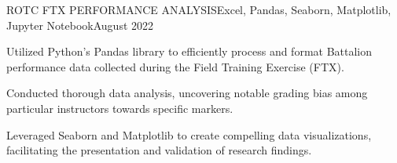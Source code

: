 \documentclass{article}
\begin{document}
\begin{flushleft}
    \begin{project}{ROTC FTX PERFORMANCE ANALYSIS}{}{Excel, Pandas, Seaborn, Matplotlib, Jupyter Notebook}{August 2022}
        \item Utilized Python's Pandas library to efficiently process and format Battalion performance data collected during the Field Training Exercise (FTX).
        \item Conducted thorough data analysis, uncovering notable grading bias among particular instructors towards specific markers.
        \item Leveraged Seaborn and Matplotlib to create compelling data visualizations, facilitating the presentation and validation of research findings.
    \end{project}
    

    \vspace{3pt}
     \\

\end{flushleft}
\end{document}
